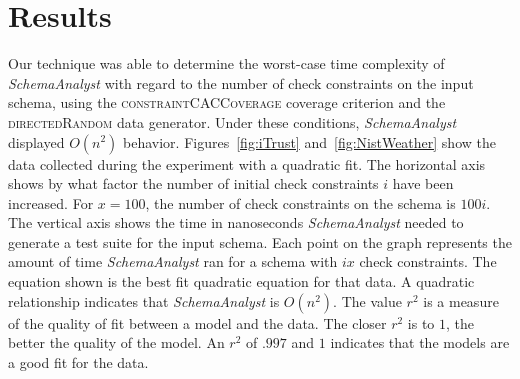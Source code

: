 \section{Results}
  \label{sec:results}

Our technique was able to determine the worst-case time
complexity of \textit{SchemaAnalyst} with regard to the number of check
constraints on the input schema, using the
\textsc{constraintCACCoverage} coverage criterion and the
\textsc{directedRandom} data generator. Under these conditions, 
\textit{SchemaAnalyst} displayed $O(n^2)$ behavior. Figures~\ref{fig:iTrust} 
and~\ref{fig:NistWeather} show the data collected during the experiment with a
quadratic fit. The horizontal axis shows by what factor the number of initial
check constraints $i$ have been increased. For $x = 100$, the number of check
constraints on the schema is $100i$. The vertical axis shows the time in
nanoseconds \textit{SchemaAnalyst} needed to generate a test suite for
the input schema. Each point on the graph represents the amount of time
\textit{SchemaAnalyst} ran for a schema with $ix$ check constraints.
The equation shown is the best fit quadratic equation for that data.  A
quadratic relationship indicates that \textit{SchemaAnalyst} is
$O(n^2)$.  The value $r^2$ is a measure of the quality of fit between a model and
the data. The closer $r^2$ is to $1$, the better the quality of the
model.  An $r^2$ of $.997$ and $1$ indicates that the models are a good fit for
the data.

